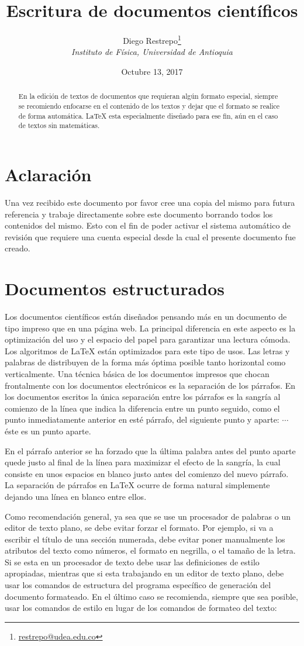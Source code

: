 \documentclass{article}
\title{Escritura de documentos científicos}
\author{Diego Restrepo\footnote{\href{mailto:restrepo@udea.edu.co}{restrepo@udea.edu.co}}\\
\textit{\small  Instituto de Física, Universidad de Antioquia}
}
\date{\small Octubre 13, 2017}
\begin{document}
\maketitle

\begin{abstract}
En la edición de textos de documentos que requieran algún formato
especial, siempre se recomiendo enfocarse en el contenido de los textos y
dejar que el formato se realice de forma automática. \LaTeX{} esta especialmente diseñado para ese fin, aún en el caso de textos sin matemáticas.
\end{abstract}
\section{Aclaración}
Una vez recibido este documento por favor cree una copia del mismo para futura referencia y trabaje directamente sobre este documento borrando todos los contenidos del mismo. Esto con el fin de poder activar el sistema automático de revisión que requiere una cuenta especial desde la cual el presente documento fue creado. 
\section{Documentos estructurados}
Los documentos científicos están diseñados pensando más en un documento de tipo impreso que en una página web. La principal diferencia en este aspecto es la optimización del uso y el espacio del papel para garantizar una lectura cómoda. Los algoritmos de \LaTeX{} están optimizados para este tipo de usos. Las letras y palabras de distribuyen de la forma más óptima posible tanto horizontal como verticalmente. Una técnica básica de los documentos impresos que chocan frontalmente con los documentos electrónicos es la separación de los párrafos. En los documentos escritos la única separación entre los párrafos es la sangría al comienzo de la línea que indica la diferencia entre un punto seguido, como el punto inmediatamente anterior en esté párrafo, del siguiente punto y aparte:  $\cdots$ \hfill éste es un punto aparte.

En el párrafo anterior se ha forzado que la última palabra antes del punto aparte quede justo al final de la línea para maximizar el efecto de la sangría, la  cual consiste en unos espacios en blanco justo antes del comienzo del nuevo párrafo. La separación de párrafos en LaTeX ocurre de forma natural simplemente dejando una línea en blanco entre ellos. 

Como recomendación general, ya sea que se use un procesador de palabras o un editor de texto plano, se debe evitar forzar el formato. Por ejemplo, si va a escribir el título de una sección numerada, debe evitar poner manualmente los atributos del texto como números, el formato en negrilla, o el tamaño de la letra. Si se esta en un procesador de texto debe usar las definiciones de estilo apropiadas, mientras que si esta trabajando en un editor de texto plano, debe usar los comandos de estructura del programa específico de generación del documento formateado. En el último caso se recomienda, siempre que sea posible, usar los comandos de estilo en lugar de los comandos de formateo del texto:
\end{document}
